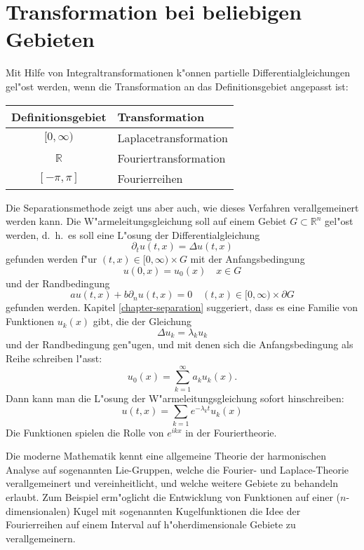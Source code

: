 \section{Transformation bei beliebigen Gebieten}
Mit Hilfe von Integraltransformationen k"onnen partielle
Differentialgleichungen  gel"ost werden, wenn die Transformation
an das Definitionsgebiet angepasst ist:
\begin{center}
\begin{tabular}{cl}
Definitionsgebiet&Transformation\\
\hline
$[0,\infty)$&Laplacetransformation\\
$\mathbb R$&Fouriertransformation\\
$[-\pi,\pi]$&Fourierreihen
\end{tabular}
\end{center}
Die Separationsmethode zeigt uns aber auch, wie dieses 
Verfahren verallgemeinert werden kann. Die W"armeleitungsgleichung
soll auf einem Gebiet $G\subset \mathbb R^n$ gel"ost werden, d.~h.~es
soll eine L"osung der Differentialgleichung
\[
\partial_t u(t,x)=\Delta u(t,x)
\]
gefunden werden f"ur $(t,x)\in [0,\infty)\times G$ mit der Anfangsbedingung
\[
u(0,x)=u_0(x) \quad x\in G
\]
und der Randbedingung
\[
au(t,x)+b\partial_nu(t,x)=0\quad (t,x)\in[0,\infty)\times \partial G
\]
gefunden werden. Kapitel \ref{chapter-separation} suggeriert, dass
es eine Familie von Funktionen $u_k(x)$ gibt, die der Gleichung
\[
\Delta u_k=\lambda_k u_k
\]
und der Randbedingung gen"ugen, und mit denen sich die 
Anfangsbedingung als Reihe schreiben l"asst:
\[
u_0(x)=\sum_{k=1}^\infty a_ku_k(x).
\]
Dann kann man die L"osung der W"armeleitungsgleichung sofort
hinschreiben:
\[
u(t,x)=\sum_{k=1}e^{-\lambda_kt}u_k(x)
\]
Die Funktionen spielen die Rolle von $e^{ikx}$ in der Fouriertheorie.

Die moderne Mathematik kennt eine allgemeine Theorie der harmonischen
Analyse auf sogenannten Lie-Gruppen, welche die Fourier- und 
Laplace-Theorie verallgemeinert und vereinheitlicht, und welche
weitere Gebiete zu behandeln erlaubt. Zum Beispiel erm"oglicht
die Entwicklung von Funktionen auf einer ($n$-dimensionalen)
Kugel mit sogenannten Kugelfunktionen die Idee der Fourierreihen
auf einem Interval auf h"oherdimensionale Gebiete zu verallgemeinern.

